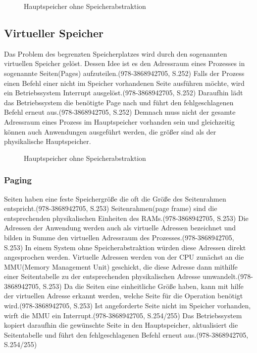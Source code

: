 \begin{figure}[htb]
	\centering
	\caption{Hauptspeicher ohne Speicherabstraktion}
\end{figure}

\subsection{Virtueller Speicher}
\label{subsec:VirtuelleAdressraeume}
Das Problem des begrenzten Speicherplatzes wird durch den sogenannten virtuellen Speicher gelöst. Dessen Idee ist es den Adressraum eines Prozesses in sogenannte Seiten(Pages) aufzuteilen.(978-3868942705, S.252) Falls der Prozess einen Befehl einer nicht im Speicher vorhandenen Seite ausführen möchte, wird ein Betriebssystem Interrupt ausgelöst.(978-3868942705, S.252) Daraufhin lädt das Betriebssystem die benötigte Page nach und führt den fehlgeschlagenen Befehl erneut aus.(978-3868942705, S.252) Demnach muss nicht der gesamte Adressraum eines Prozess im Hauptspeicher vorhanden sein und gleichzeitig können auch Anwendungen ausgeführt werden, die größer sind als der physikalische Hauptspeicher.

\begin{figure}[htb]
	\centering
	\caption{Hauptspeicher ohne Speicherabstraktion}
\end{figure}

\subsubsection{Paging}
Seiten haben eine feste Speichergröße die oft die Größe des Seitenrahmen entspricht.(978-3868942705, S.253) Seitenrahmen(page frame) sind die entsprechenden physikalischen Einheiten des RAMs.(978-3868942705, S.253) Die Adressen der Anwendung werden auch als virtuelle Adressen bezeichnet und bilden in Summe den virtuellen Adressraum des Prozesses.(978-3868942705, S.253) In einem System ohne Speicherabstraktion würden diese Adressen direkt angesprochen werden. Virtuelle Adressen werden von der CPU zunächst an die MMU(Memory Management Unit) geschickt, die diese Adresse dann mithilfe einer Seitentabelle zu der entsprechenden physikalischen Adresse umwandelt.(978-3868942705, S.253) Da die Seiten eine einheitliche Größe haben, kann mit hilfe der virtuellen Adresse erkannt werden, welche Seite für die Operation benötigt wird.(978-3868942705, S.253) Ist angeforderte Seite nicht im Speicher vorhanden, wirft die MMU ein Interrupt.(978-3868942705, S.254/255) Das Betriebssystem kopiert daraufhin die gewünschte Seite in den Hauptspeicher, aktualisiert die Seitentabelle und führt den fehlgeschlagenen Befehl erneut aus.(978-3868942705, S.254/255) 

